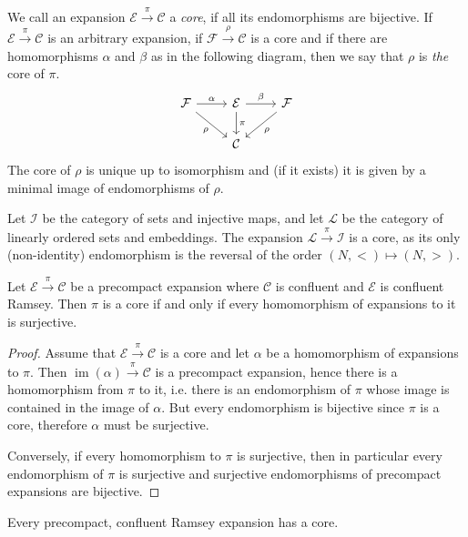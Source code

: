 \documentclass[preprint,12pt]{elsarticle}
\newcommand{\cat}[1]{\mathcal{#1}}
\DeclareMathOperator{\im}{im}
\begin{document}
\begin{defin}
\label{def:core}
    We call an expansion $\cat E\xrightarrow{\pi}\cat C$ a \emph{core}, if all its endomorphisms are bijective. If $\cat E\xrightarrow{\pi}\cat C$ is an arbitrary expansion, if $\cat F\xrightarrow{\rho}\cat C$ is a core and if there are homomorphisms $\alpha$ and $\beta$ as in the following diagram, then we say that $\rho$ is \emph{the} core of $\pi$.
    $$
    \begin{tikzcd}
\cat F \arrow[r, "\alpha"] \arrow[rd, "\rho"']  
& 
\cat E \arrow[r, "\beta"] \arrow[d, "\pi"] & 
\cat F \arrow[ld, "\rho"] \\
 & \cat C   &                            
\end{tikzcd}
    $$
    The core of $\rho$ is unique up to isomorphism and (if it exists) it is given by a minimal image of endomorphisms of $\rho$. 
\end{defin}

\begin{exam}
    Let $\cat I$ be the category of sets and injective maps, and let $\cat L$ be the category of linearly ordered sets and embeddings. The expansion $\cat L\xrightarrow{\pi}\cat I$ is a core, as its only (non-identity) endomorphism is the reversal of the order $(N,<)\mapsto(N,>)$.
\end{exam}


\begin{lem}
\label{lem:coreSurj}
    Let $\cat E\xrightarrow{\pi}\cat C$ be a precompact expansion where $\cat C$ is confluent and $\cat E$ is confluent Ramsey. Then $\pi$ is a core if and only if every homomorphism of expansions to it is surjective. 
\end{lem}

\begin{proof}
    Assume that $\cat E\xrightarrow{\pi}\cat C$ is a core and let $\alpha$ be a homomorphism of expansions to $\pi$. Then $\im(\alpha)\xrightarrow{\pi}\cat C$ is a precompact expansion, hence there is a homomorphism from $\pi$ to it, i.e. there is an endomorphism of $\pi$ whose image is contained in the image of $\alpha$. But every endomorphism is bijective since $\pi$ is a core, therefore $\alpha$ must be surjective.

    Conversely, if every homomorphism to $\pi$ is surjective, then in particular every endomorphism of $\pi$ is surjective and surjective endomorphisms of precompact expansions are bijective.
\end{proof}


\begin{thm}
\label{thm:cores}
    Every precompact, confluent Ramsey expansion has a core.
\end{thm}
\end{document}
